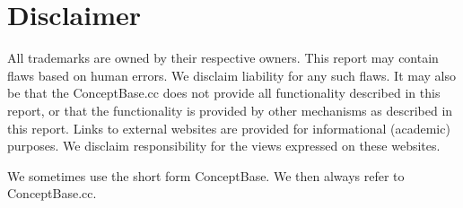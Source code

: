 \section{Disclaimer}
\label{sec:disclaimer}

All trademarks are owned by their respective owners. This report may contain flaws based on
human errors. We disclaim liability for any such flaws. It may also be that the ConceptBase.cc
does not provide all functionality described in this report, or that the functionality is provided
by other mechanisms as described in this report. Links to external websites are provided for
informational (academic) purposes. We disclaim responsibility for the views expressed on these websites.

We sometimes use the short form ConceptBase. We then always refer to ConceptBase.cc. 










